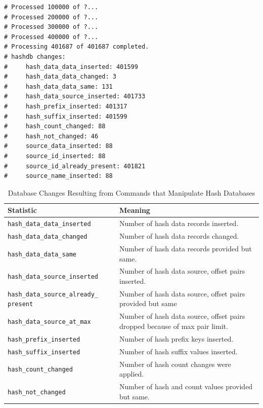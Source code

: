 \documentclass[11pt,fleqn]{article} %
\begin{document}
\lstset{style=customfile}
\begin{lstlisting}[float, caption={Example report of a database change from an import operation}, label=DatabaseChanges]
# Processed 100000 of ?...
# Processed 200000 of ?...
# Processed 300000 of ?...
# Processed 400000 of ?...
# Processing 401687 of 401687 completed.
# hashdb changes:
#     hash_data_data_inserted: 401599
#     hash_data_data_changed: 3
#     hash_data_data_same: 131
#     hash_data_source_inserted: 401733
#     hash_prefix_inserted: 401317
#     hash_suffix_inserted: 401599
#     hash_count_changed: 88
#     hash_not_changed: 46
#     source_data_inserted: 88
#     source_id_inserted: 88
#     source_id_already_present: 401821
#     source_name_inserted: 88
\end{lstlisting}

\begin{table}[!ht]
\centering
\caption{Database Changes Resulting from Commands that Manipulate Hash Databases}
\label{tab:changeStatistics}
\begin{tabular}{|p{5 cm}|p{8.8 cm}|}
\hline \hline
\textbf{Statistic} & \textbf{Meaning} \\
\hline

\verb+hash_data_data_inserted+ &  Number of hash data records inserted.\\
\hline
\verb+hash_data_data_changed+ &  Number of hash data records changed.\\
\hline
\verb+hash_data_data_same+ &  Number of hash data records provided but same.\\
\hline
\verb+hash_data_source_inserted+ &  Number of hash data source, offset pairs inserted.\\
\hline
\verb+hash_data_source_already_+ \verb+present+ &  Number of hash data source, offset pairs provided but same\\
\hline
\verb+hash_data_source_at_max+ &  Number of hash data source, offset pairs dropped because of max pair limit.\\
\hline

\verb+hash_prefix_inserted+ &  Number of hash prefix keys inserted.\\
\hline
\verb+hash_suffix_inserted+ &  Number of hash suffix values inserted.\\
\hline
\verb+hash_count_changed+ &  Number of hash count changes were applied.\\
\hline
\verb+hash_not_changed+ &  Number of hash and count values provided but same.\\
\hline


\end{tabular}
\end{table}
\end{document}
